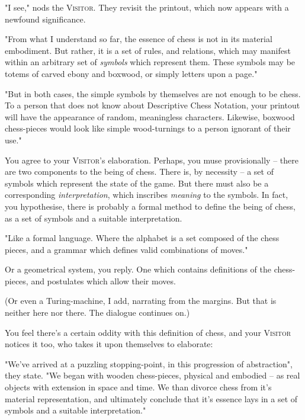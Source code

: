 "I see," nods the \textsc{Visitor}. They revisit the printout, which now appears with a newfound significance.

"From what I understand so far, the essence of chess is not in its material embodiment. But rather, it is a set of rules, and relations, which may manifest within an arbitrary set of \emph{symbols} which represent them. These symbols may be totems of carved ebony and boxwood, or simply letters upon a page."

"But in both cases, the simple symbols by themselves are not enough to be chess. To a person that does not know about Descriptive Chess Notation, your printout will have the appearance of random, meaningless characters. Likewise, boxwood chess-pieces would look like simple wood-turnings to a person ignorant of their use."


You agree to your \textsc{Visitor}'s elaboration. Perhaps, you muse provisionally -- there are two components to the being of chess. There is, by necessity -- a set of symbols which represent the state of the game. But there must also be a corresponding \emph{interpretation}, which inscribes \emph{meaning} to the symbols. In fact, you hypothesise, there is probably a formal method to define the being of chess, as a set of symbols and a suitable interpretation.

"Like a formal language. Where the alphabet is a set composed of the chess pieces, and a grammar which defines valid combinations of moves."

Or a geometrical system, you reply. One which contains definitions of the chess-pieces, and postulates which allow their moves.

(Or even a Turing-machine, I add, narrating from the margins. But that is neither here nor there. The dialogue continues on.)

You feel there's a certain oddity with this definition of chess, and your \textsc{Visitor} notices it too, who takes it upon themselves to elaborate:

"We've arrived at a puzzling stopping-point, in this progression of abstraction", they state. "We began with wooden chess-pieces, physical and embodied -- as real objects with extension in space and time. We than divorce chess from it's material representation, and ultimately conclude that it's essence lays in a set of symbols and a suitable interpretation."

